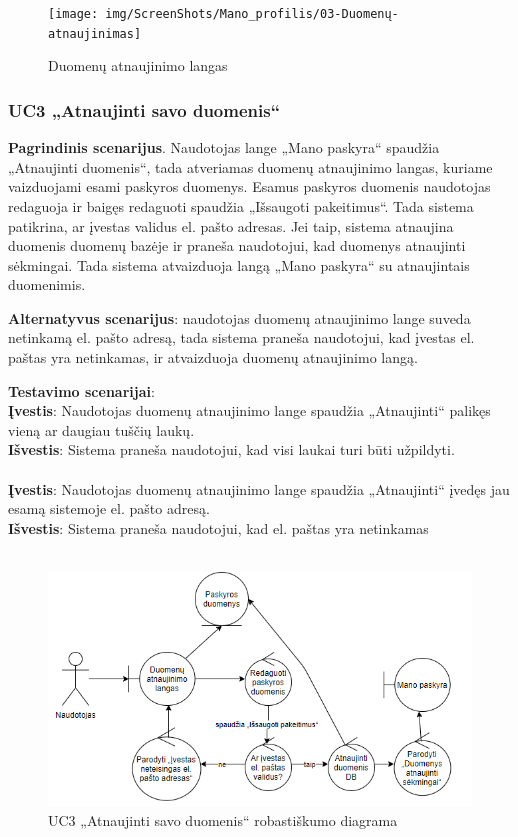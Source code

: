 \documentclass{VUMIFPSbakalaurinis}
\begin{document}
\begin{figure}[H]
	\centering
	\texttt{[image: img/ScreenShots/Mano\_profilis/03-Duomenų-atnaujinimas]}
	\caption{Duomenų atnaujinimo langas}
	\label{img:update profile}
\end{figure}
\subsubsection{UC3 „Atnaujinti savo duomenis“}
\textbf{Pagrindinis scenarijus}. Naudotojas lange „Mano paskyra“ spaudžia „Atnaujinti duomenis“, tada atveriamas duomenų atnaujinimo langas, kuriame vaizduojami esami paskyros duomenys. Esamus paskyros duomenis naudotojas redaguoja ir baigęs redaguoti spaudžia „Išsaugoti pakeitimus“. Tada sistema patikrina, ar įvestas validus el. pašto adresas. Jei taip, sistema atnaujina duomenis duomenų bazėje ir praneša naudotojui, kad duomenys atnaujinti sėkmingai. Tada sistema atvaizduoja langą „Mano paskyra“ su atnaujintais duomenimis. 
\par\textbf{Alternatyvus scenarijus}: naudotojas duomenų atnaujinimo lange suveda netinkamą el. pašto adresą, tada sistema praneša naudotojui, kad įvestas el. paštas yra netinkamas, ir atvaizduoja duomenų atnaujinimo langą.
\par \textbf{Testavimo scenarijai}:\\
\textbf{Įvestis}: Naudotojas duomenų atnaujinimo lange spaudžia „Atnaujinti“ palikęs vieną ar daugiau tuščių laukų. \\
\textbf{Išvestis}: Sistema praneša naudotojui, kad visi laukai turi būti užpildyti. \\ \\
\textbf{Įvestis}: Naudotojas duomenų atnaujinimo lange spaudžia „Atnaujinti“ įvedęs jau esamą sistemoje el. pašto adresą. \\
\textbf{Išvestis}: Sistema praneša naudotojui, kad el. paštas yra netinkamas\\ \\

\begin{figure}[H]
	\centering
	\includegraphics[scale=0.6]{img/Robustness/UC3}
	\caption{UC3 „Atnaujinti savo duomenis“ robastiškumo diagrama}
	\label{img:uc3rob}
\end{figure}
\end{document}
